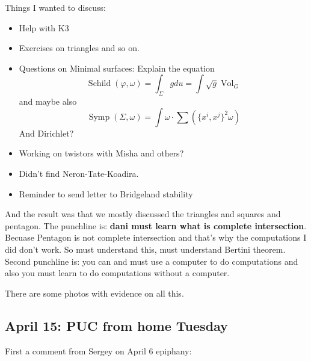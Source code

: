 Things I wanted to discuss:
\begin{itemize}
\item Help with K3
\item Exercises on triangles and so on.	
\item Questions on Minimal surfaces: Explain the equation
	\[\operatorname{ Schild}(\varphi,\omega)=\int_{\Sigma}g du=\int \sqrt{g} \operatorname{Vol}_G\]
	and maybe also
	\[\operatorname{Symp}(\Sigma,\omega)=\int \omega\cdot \sum\left(\{x^i,x^j\}^2\omega\right) \]
And Dirichlet?
\item Working on twistors with Misha and others?
\item Didn't find Neron-Tate-Koadira.
\item  Reminder to send letter to Bridgeland stability
\end{itemize}

And the result was that we mostly discussed the triangles and squares and pentagon. The punchline is: \textbf{dani must learn what is complete intersection}. Becuase Pentagon is not complete intersection and that's why the computations I did don't work. So must understand this, must understand Bertini theorem. Second punchline is: you can and must use a computer to do computations and also you must learn to do computations without a computer.

There are some photos with evidence on all this.

\subsection{April 15: PUC from home Tuesday}

First a comment from Sergey on April 6 epiphany:

